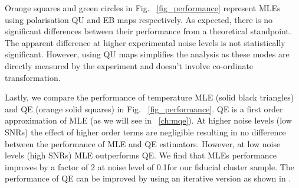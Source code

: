  Orange squares and green circles in Fig. ~\ref{fig_performance} represent MLEs using polarisation QU and EB maps respectively. 
 As expected, there is no significant differences between their performance from a theoretical standpoint. 
 The apparent difference at higher experimental noise levels is not statistically significant.
 However, using QU maps simplifies the analysis as these modes are directly measured by the experiment and doesn't involve co-ordinate transformation. %
 
  
 Lastly, we compare the performance of temperature MLE (solid black triangles) and QE (orange solid squares) in Fig. ~\ref{fig_performance}. 
 QE is a first order approximation of MLE (as we will see in ~\ref{ch:mqe}).
 At higher noise levels (low SNRs) the effect of higher order terms are negligible resulting in no difference between the performance of MLE and QE estimators.
 However, at low noise levels (high SNRs) MLE outperforms QE. We find that MLEs performance improves by a factor of 2 at noise level of 0.1\ukam for our fiducial cluster sample. 
 The performance of QE can be improved by using an iterative version as shown in \cite{yoo08}.
  
